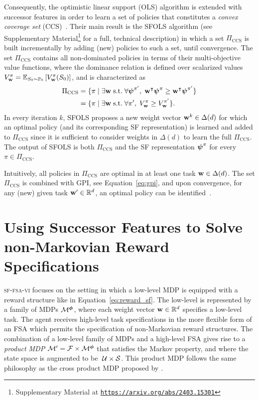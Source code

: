  Consequently, the optimistic linear support (OLS) algorithm is extended with successor features in order to learn a set of policies that constitutes a \textit{convex coverage set} (CCS)~\citep{Roijers2015}. Their main result is the SFOLS algorithm (see Supplementary Material\footnote{Supplementary Material at {\texttt{\url{https://arxiv.org/abs/2403.15301}}}} for a full, technical description) in which a set $\Pi_\text{CCS}$ is built incrementally by adding (new) policies to such a set, until convergence. The set $\Pi_\text{CCS}$ contains all non-dominated policies in terms of their multi-objective value functions, where the dominance relation is defined over scalarized values ${V^\pi_{\mathbf{w}} = \mathbb{E}_{S_0\sim\mathbb{P}_0}\left[V^\pi_{\mathbf{w}}(S_0)\right]}$, and is characterized as
\begin{align}
  \Pi_\text{CCS} &= \{\pi\;\lvert\;\exists\mathbf{w}\;\text{s.t.}\;\forall {\boldsymbol{\mathbf{\psi}}}^{\pi'},\; \mathbf{w}^\intercal {\boldsymbol{\mathbf{\psi}}}^\pi {\;\geq\;} \mathbf{w}^\intercal{\boldsymbol{\mathbf{\psi}}}^{\pi'} \} \nonumber\\
  &= \{ \pi \;\lvert\;\exists\mathbf{w}\;\text{s.t.}\;\forall {\pi'},\; {V^\pi_{\mathbf{w}}}{\;\geq\;} {V^{\pi'}_{\mathbf{w}}}\}.
\end{align} 
In every iteration $k$, SFOLS proposes a new weight vector $\mathbf{w}^k\in\Delta(d)$ for which an optimal policy (and its corresponding SF representation) is learned and added to $\Pi_\text{CCS}$ since it is sufficient to consider weights in $\Delta(d)$ to learn the full $\Pi_\text{CCS}$. The output of SFOLS is both $\Pi_\text{CCS}$ and the SF representation $\boldsymbol{\mathbf{\psi}}^\pi$ for every $\pi\in\Pi_\text{CCS}$.
 
Intuitively, all policies in $\Pi_\text{CCS}$ are optimal in at least one task $\mathbf{w} \in \Delta(d)$.
The set $\Pi_\text{CCS}$ is combined with GPI, see Equation~\eqref{eq:gpi}, and upon convergence, for any (new) given task $\mathbf{w}'\in\mathbb{R}^d$, an optimal policy can be identified~\citep[cf. Theorem 2]{Alegre2022}.


\section{Using Successor Features to Solve non-Markovian Reward Specifications}

\textsc{sf-fsa-vi} focuses on the setting in which a low-level MDP is equipped with a reward structure like in Equation~\eqref{eq:reward_sf}. The low-level is represented by a family of MDPs $\mathcal{M}^{\boldsymbol{\phi}}$, where each weight vector $\mathbf{w}\in\mathbb{R}^d$ specifies a low-level task. The agent receives high-level task specifications in the more flexible form of an FSA which permits the specification of non-Markovian reward structures. The combination of a low-level family of MDPs and a high-level FSA gives rise to a \textit{product MDP} $\mathcal{M}'=\mathcal{F}\times\mathcal{M}^{\boldsymbol{\phi}}$ that satisfies the Markov property, and where the state space is augmented to be $\;\mathcal{U}\times\mathcal{S}$. This product MDP follows the same philosophy as the cross product MDP proposed by \citet{Icarte2022}.

